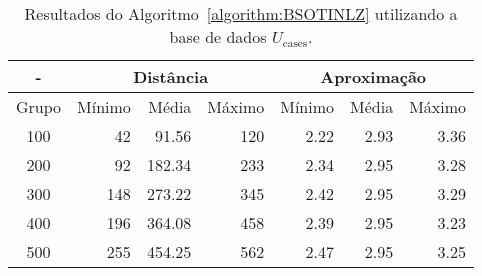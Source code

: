 \begin{table}[!htb]
  \caption{Resultados do Algoritmo~\ref{algorithm:BSOTINLZ} utilizando a base de dados $U_{\text{cases}}$.}
  \label{table:OJKJSYXE}
  \centering
  \begin{tabular}{|c|r|r|r|r|r|r|}
    \hline
      -      & \multicolumn{3}{c|}{Distância}             & \multicolumn{3}{c|}{Aproximação}           \\ \hline
    Grupo    & Mínimo       & Média        & Máximo       & Mínimo       & Média        & Máximo       \\ \hline  
    100      &  42          &  91.56       & 120          & 2.22         & 2.93         & 3.36         \\ \hline
    200      &  92          & 182.34       & 233          & 2.34         & 2.95         & 3.28         \\ \hline
    300      & 148          & 273.22       & 345          & 2.42         & 2.95         & 3.29         \\ \hline
    400      & 196          & 364.08       & 458          & 2.39         & 2.95         & 3.23         \\ \hline
    500      & 255          & 454.25       & 562          & 2.47         & 2.95         & 3.25         \\ \hline    
  \end{tabular}
\end{table}